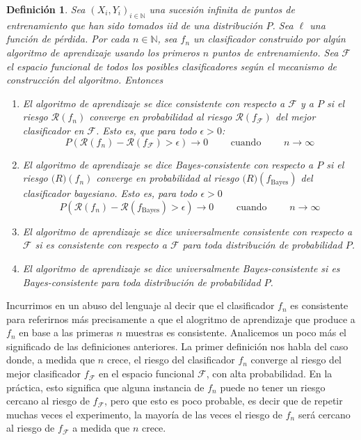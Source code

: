 \documentclass{report}
\newtheorem{dfn}{Definición}[subsection]
\begin{document}
\begin{dfn}
    Sea $(X_i,Y_i)_{i\in\mathbb{N}}$ una sucesión infinita de puntos de entrenamiento que han sido tomados iid de una distribución $P$.
    Sea $\ell$ una función de pérdida. Por cada $n\in \mathbb{N}$, sea $f_n$ un clasificador construido por algún algoritmo de aprendizaje
    usando los primeros $n$ puntos de entrenamiento. Sea $\mathcal{F}$ el espacio funcional de todos los posibles clasificadores según
    el mecanismo de construcción del algoritmo. Entonces
    \begin{enumerate}
    \item  El algoritmo de aprendizaje se dice \textnormal{consistente con respecto a $\mathcal{F}$ y a $P$} si el riesgo $\mathcal{R}(f_n)$
     converge en probabilidad al riesgo  $\mathcal{R}(f_{\mathcal{F}})$ del mejor clasificador en $\mathcal{F}$. Esto es,
     que para todo $\epsilon>0$:
     \[
     P\left(\mathcal{R}(f_n)-\mathcal{R}(f_{\mathcal{F}})>\epsilon\right) \rightarrow 0 \qquad \text{ cuando } \qquad n\rightarrow \infty
     \]
     \item  El algoritmo de aprendizaje se dice \textnormal{Bayes-consistente con respecto a $P$} si el riesgo $\mathcal(R)(f_n)$
     converge en probabilidad al riesgo  $\mathcal(R)(f_{\text{Bayes}})$ del clasificador bayesiano. Esto es, para todo $\epsilon>0$
    \[
     P\left(\mathcal{R}(f_n)-\mathcal{R}(f_{\text{Bayes}})>\epsilon\right) \rightarrow 0 \qquad \text{ cuando } \qquad n\rightarrow \infty
    \]
    \item  El algoritmo de aprendizaje se dice \textnormal{universalmente consistente con respecto a $\mathcal{F}$} si 
    es consistente con respecto a $\mathcal{F}$ para toda distribución de probabilidad $P$.
    \item  El algoritmo de aprendizaje se dice \textnormal{universalmente Bayes-consistente } si 
    es Bayes-consistente para toda distribución de probabilidad $P$.
    \end{enumerate}
    \label{def:consistencias}
\end{dfn}

Incurrimos en un abuso del lenguaje al decir que el clasificador $f_n$ es consistente para referirnos más precisamente a que
el alogritmo de aprendizaje que produce a $f_n$ en base a las primeras $n$ muestras es consistente. Analicemos un poco más el
significado de las definiciones anteriores. La primer definición nos habla del caso donde, a medida que $n$ crece, el riesgo
del clasificador $f_n$ converge al riesgo del mejor clasificador $f_{\mathcal{F}}$ en el espacio funcional $\mathcal{F}$, con alta probabilidad.
En la práctica, esto significa que alguna instancia de $f_n$ puede no tener un riesgo cercano al riesgo de $f_{\mathcal{F}}$, pero que esto es poco
probable, es decir que de repetir muchas veces el experimento, la mayoría de las veces el riesgo de $f_n$ será cercano al riesgo de $f_{\mathcal{F}}$
a medida que $n$ crece. \newline
\end{document}
